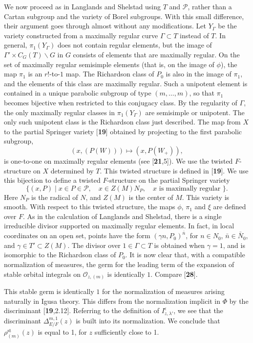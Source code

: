 \documentclass{amsart}
\begin{document}
We now proceed as in Langlands and Shelstad using $T$ and $\mathcal P$, rather
than a Cartan subgroup and the variety of Borel subgroups.  With this small
difference, their argument goes through almost without any modifications.
Let $Y_\Gamma$ be the variety constructed from
a maximally regular curve $\Gamma\subset T$ instead of $T$.  In general,
$\pi_1(Y_\Gamma)$ does not contain regular elements, but the image of $\Gamma'\times C_G(T)\backslash G$
in $G$ consists of elements that are maximally regular.  On the set of maximally regular
semisimple elements (that is, on the image of $\phi$), 
the map $\pi_1$ is an $r!$-to-$1$ map.  The Richardson class
of $P_0$ is also in the image of $\pi_1$, and the elements of this class are 
maximally regular.  Such a
unipotent element is contained in a unique parabolic subgroup of type
$(m,\ldots,m)$, so that $\pi_1$ becomes bijective when restricted to this
conjugacy class.  By the regularity of $\Gamma$, the only maximally regular
classes in $\pi_1(Y_\Gamma)$ are semisimple or unipotent.  The only such unipotent class is
the Richardson class just described.  The map from $X$ to the partial
Springer variety [{\bf 19}] obtained by projecting to the first parabolic subgroup,
$$(x,(P(W))) \mapsto (x,P(W_+)),$$
is one-to-one on maximally regular elements (see [{\bf 21},5]).
We use the twisted $F$-structure
on $X$ determined by $T$. This twisted structure is defined in [{\bf 19}].  We use this bijection
to define a twisted $F$-structure on the partial Springer variety
$$\{(x,P)\mid x\in P\in{\mathcal P}, \quad x \in Z(M)N_P,\quad x\text{ is maximally regular }\}.$$
Here $N_P$ is the radical of $N$, and $Z(M)$ is the center of $M$.
This variety is smooth.  With respect to this
twisted structure, the maps $\phi$, $\pi_1$ and $\xi$ are defined over $F$.
As in the calculation of Langlands and Shelstad, there
is a single irreducible divisor supported on maximally regular elements.
In fact, in local coordinates
on an open set,
points have the form $(\gamma n,P_0)^{\bar n}$, for $n\in N_0$, $\bar n\in \bar N_0$,
and $\gamma\in T'\subset Z(M)$.
%
The divisor over $1\in\Gamma\subset T$ is obtained when $\gamma=1$, and is
isomorphic to the Richardson class of $P_0$.  It is now clear that, with
a compatible
normalization of measures, the germ for the leading term of the expansion
of stable orbital integrals on ${\mathcal O}_{z,(m)}$ is
identically $1$.  Compare [{\bf 28}].

This stable  germ is identically $1$ for the normalization of measures
arising naturally in Igusa theory.  This differs from the normalization
implicit in $\Phi$
by the discriminant [{\bf 19},2.12].  
Referring to the definition of $I^\epsilon_{z,\lambda'}$, we
see that the discriminant $\Delta^{m,1}_{E/F}(z)$ is built into
its normalization.
We conclude that
$\rho^{\text{st}}_{(m)}(z)$ is equal to 1,
for $z$ sufficiently close to 1.
\end{document}
